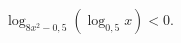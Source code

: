 \begin{ex}[type=inequality]
	\begin{condition}
		$\log_{8x^2-0,5}(\log_{0,5} x)<0  .$
	\end{condition}
\end{ex}
